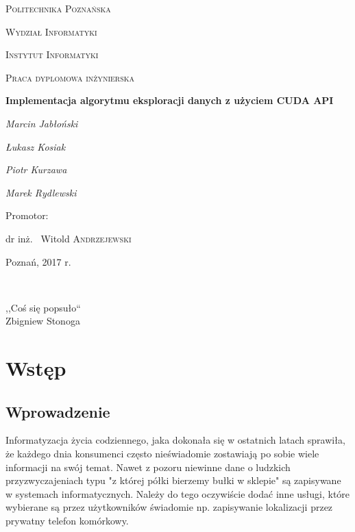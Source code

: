 \documentclass[12pt]{article}
\begin{document}
\begin{titlepage}
	\centering
	{\scshape\LARGE Politechnika Poznańska \par}
	{\scshape\LARGE Wydział Informatyki \par}
	{\scshape\LARGE Instytut Informatyki \par}
	\vspace{1cm}
	{\scshape\Large Praca dyplomowa inżynierska\par}
	\vspace{1.5cm}
	{\huge\bfseries Implementacja algorytmu eksploracji danych z użyciem CUDA API\par}
	\vspace{2cm}
	{\Large\itshape Marcin Jabłoński \par}
	{\Large\itshape Łukasz Kosiak \par}
	{\Large\itshape Piotr Kurzawa \par}
	{\Large\itshape Marek Rydlewski \par}
	\vfill
	\begin{flushright}
	Promotor:\par
	dr inż. ~Witold \textsc{Andrzejewski}
	\end{flushright}
	\vfill
	{\large Poznań, 2017 r.\par}
\end{titlepage}
\thispagestyle{empty} %
$\mbox{ }$
\vfill\vfill
\hfill
\begin{flushright}
\begin{em}
,,Coś się popsuło`` \\
Zbigniew Stonoga
\end{em}
\end{flushright}
\vfill\pagebreak
\tableofcontents
\newpage

\section{Wstęp}

\subsection{Wprowadzenie}
Informatyzacja życia codziennego, jaka dokonała się w ostatnich latach sprawiła, że każdego dnia konsumenci często nieświadomie zostawiają po sobie wiele informacji na swój temat. Nawet z pozoru niewinne dane o ludzkich przyzwyczajeniach typu "z której półki bierzemy bułki w sklepie" są zapisywane w systemach informatycznych. Należy do tego oczywiście dodać inne usługi, które wybierane są przez użytkowników świadomie np. zapisywanie lokalizacji przez prywatny telefon komórkowy.
\end{document}
